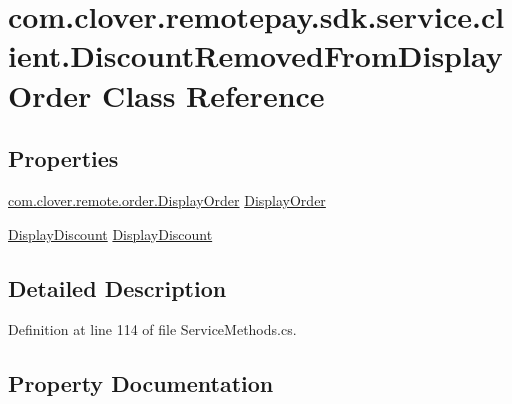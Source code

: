 \hypertarget{classcom_1_1clover_1_1remotepay_1_1sdk_1_1service_1_1client_1_1_discount_removed_from_display_order}{}\section{com.\+clover.\+remotepay.\+sdk.\+service.\+client.\+Discount\+Removed\+From\+Display\+Order Class Reference}
\label{classcom_1_1clover_1_1remotepay_1_1sdk_1_1service_1_1client_1_1_discount_removed_from_display_order}
\subsection*{Properties}
\begin{DoxyCompactItemize}
\item 
\hyperlink{classcom_1_1clover_1_1remote_1_1order_1_1_display_order}{com.\+clover.\+remote.\+order.\+Display\+Order} \hyperlink{classcom_1_1clover_1_1remotepay_1_1sdk_1_1service_1_1client_1_1_discount_removed_from_display_order_a05fdafb9aa430584e97b57e51c4d8c0d}{Display\+Order}
\item 
\hyperlink{classcom_1_1clover_1_1remote_1_1order_1_1_display_discount}{Display\+Discount} \hyperlink{classcom_1_1clover_1_1remotepay_1_1sdk_1_1service_1_1client_1_1_discount_removed_from_display_order_a0547e7436e9082931a0aebf72f0211ee}{Display\+Discount}
\end{DoxyCompactItemize}


\subsection{Detailed Description}


Definition at line 114 of file Service\+Methods.\+cs.



\subsection{Property Documentation}
\mbox{\label{classcom_1_1clover_1_1remotepay_1_1sdk_1_1service_1_1client_1_1_discount_removed_from_display_order_a0547e7436e9082931a0aebf72f0211ee}} 

